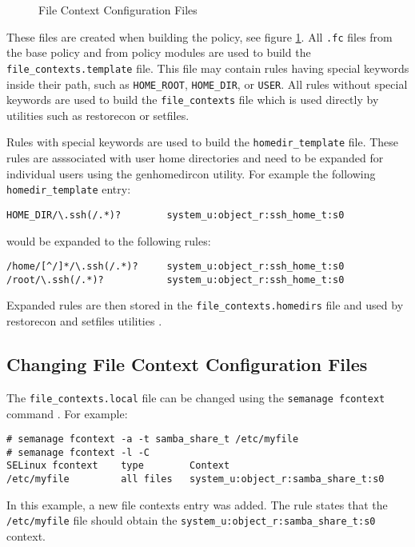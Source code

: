 \begin{figure}
    \centering
    \label{fig:filecontexts}
    
    \caption{File Context Configuration Files}
\end{figure}

These files are created when building the policy, see figure
\ref{fig:filecontexts}. All \texttt{.fc} files from the base policy and from
policy modules are used to build the \texttt{file\_contexts.template} file. This
file may contain rules having special keywords inside their path, such as
\texttt{HOME\_ROOT}, \texttt{HOME\_DIR}, or \texttt{USER}. All rules without
special keywords are used to build the \texttt{file\_contexts} file which is
used directly by utilities such as restorecon or setfiles.

Rules with special keywords are used to build the \texttt{homedir\_template}
file. These rules are asssociated with user home directories and need to be
expanded for individual users using the genhomedircon utility. For example the
following \texttt{homedir\_template} entry:
\begin{lstlisting}
HOME_DIR/\.ssh(/.*)?        system_u:object_r:ssh_home_t:s0
\end{lstlisting}
would be expanded to the following rules:
\begin{lstlisting}
/home/[^/]*/\.ssh(/.*)?     system_u:object_r:ssh_home_t:s0
/root/\.ssh(/.*)?           system_u:object_r:ssh_home_t:s0
\end{lstlisting}
Expanded rules are then stored in the \texttt{file\_contexts.homedirs} file and
used by restorecon and setfiles utilities \cite[pp.~134--140]{tsn}.

\subsection{Changing File Context Configuration Files}
The \texttt{file\_contexts.local} file can be changed using the \texttt{semanage
fcontext} command \cite{selinuxguide}. For example:
\begin{lstlisting}
# semanage fcontext -a -t samba_share_t /etc/myfile
# semanage fcontext -l -C
SELinux fcontext    type        Context
/etc/myfile         all files   system_u:object_r:samba_share_t:s0
\end{lstlisting}
In this example, a new file contexts entry was added. The rule states that the
\texttt{/etc/myfile} file should obtain the
\texttt{system\_u:object\_r:samba\_share\_t:s0} context.


